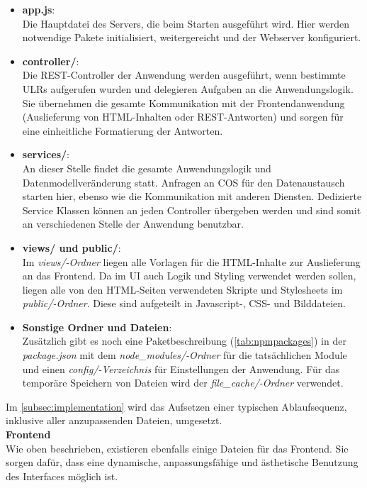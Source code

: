 \begin{itemize}
	\item \textbf{app.js}:\\
	Die Hauptdatei des Servers, die beim Starten ausgeführt wird. Hier werden notwendige Pakete initialisiert, weitergereicht und der Webserver konfiguriert.
	\item \textbf{controller/}:\\
	Die REST-Controller der Anwendung werden ausgeführt, wenn bestimmte ULRs aufgerufen wurden und delegieren Aufgaben an die Anwendungslogik. Sie übernehmen die gesamte Kommunikation mit der Frontendanwendung (Auslieferung von HTML-Inhalten oder REST-Antworten) und sorgen für eine einheitliche Formatierung der Antworten.
	\item \textbf{services/}:\\
	An dieser Stelle findet die gesamte Anwendungslogik und Datenmodellveränderung statt. Anfragen an \ac{COS} für den Datenaustausch starten hier, ebenso wie die Kommunikation mit anderen Diensten.
	Dedizierte Service Klassen können an jeden Controller übergeben werden und sind somit an verschiedenen Stelle der Anwendung benutzbar.
	\item \textbf{views/ und public/}:\\
	Im \textit{views/-Ordner} liegen alle Vorlagen für die HTML-Inhalte zur Auslieferung an das Frontend. Da im \ac{UI} auch Logik und Styling verwendet werden sollen, liegen alle von den HTML-Seiten verwendeten Skripte und Stylesheets im \textit{public/-Ordner}.
	Diese sind aufgeteilt in Javascript-, CSS- und Bilddateien.
	\item \textbf{Sonstige Ordner und Dateien}:\\
	Zusätzlich gibt es noch eine Paketbeschreibung (\autoref{tab:npmpackages}) in der \textit{package.json} mit dem \textit{node\_modules/-Ordner} für die tatsächlichen Module und einen \textit{config/-Verzeichnis} für Einstellungen der Anwendung. Für das temporäre Speichern von Dateien wird der \textit{file\_cache/-Ordner} verwendet.
\end{itemize}

Im \autoref{subsec:implementation} wird das Aufsetzen einer typischen Ablaufsequenz, inklusive aller anzupassenden Dateien, umgesetzt.\\

\textbf{Frontend}\\
Wie oben beschrieben, existieren ebenfalls einige Dateien für das Frontend. Sie sorgen dafür, dass eine dynamische, anpassungsfähige und ästhetische Benutzung des Interfaces möglich ist.

